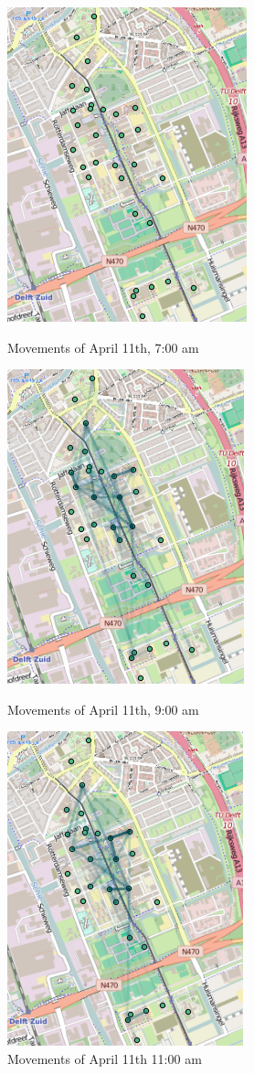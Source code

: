 \begin{figure}[H]
\includegraphics[scale=0.6,left]{frame009}
\captionsetup{justification=centering}
\caption{Movements of April 11th, 7:00 am}
\endminipage\hfill
{}
\includegraphics[scale=0.6,center]{frame021}
\captionsetup{justification=centering}
\caption{Movements of April 11th, 9:00 am}
\endminipage\hfill
{}
\includegraphics[scale=0.6,right]{frame033}
\captionsetup{justification=centering}
\caption{Movements of April 11th 11:00 am}
\endminipage\hfill
\end{figure}


